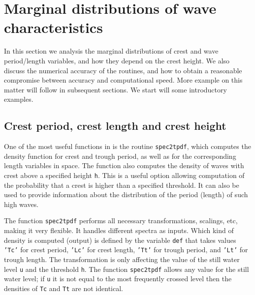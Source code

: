 \section{Marginal distributions of wave characteristics}
\label{sec:marginaldistributions}

In this section we analysis the marginal distributions of crest and
wave period/length variables, and how they depend on the crest height.
We also discuss the numerical accuracy of the \progname{} routines, and how to
obtain a reasonable compromise between accuracy and computational speed.
More example on this matter will follow in subsequent sections.
We start will some introductory examples.

\subsection{Crest period, crest length and crest height}

One of the most useful functions in \progname{} is the routine
\verb+spec2tpdf+, which computes the density function for
crest and trough period, as well as for the corresponding length variables in space.
 The function also computes the density of waves
with crest above a specified height {\tt h}. This is a useful option
allowing computation of the probability that a crest is higher than a
specified threshold. It can also be used to provide information about the
distribution of the period (length) of such high waves.

The function {\tt spec2tpdf} performs all necessary transformations,
scalings, etc, making it very flexible. It handles different spectra
as inputs. Which kind of density is computed (output) is defined
by the variable {\tt def} that takes values
{\tt 'Tc'} for crest period, {\tt 'Lc'} for crest length, {\tt 'Tt'}
for trough period, and {\tt 'Lt'} for trough length.
The transformation is only affecting the value of the still water
level {\tt u} and the threshold {\tt h}.
The function {\tt spec2tpdf} allows any value for
the still water level; if {\tt u} it is not equal to the most frequently
crossed level then the densities of {\tt Tc} and {\tt Tt} are not identical.

